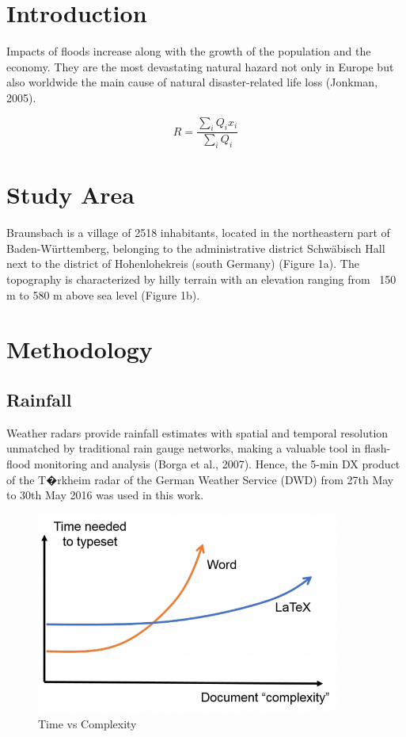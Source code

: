 \documentclass[preprint,12pt]{elsarticle}
\begin{document}

\section{Introduction}

Impacts of floods increase along with the growth of the population and the economy. They are the most devastating natural hazard not only in Europe but also worldwide the main cause of natural disaster-related life loss (Jonkman, 2005).

\begin{equation}
R=\frac{\sum_{i} Q_{i} x_i}{\sum_{i} Q_i}
\end{equation}

\section{Study Area}

Braunsbach is a village of 2518 inhabitants, located in the northeastern part of Baden-W{\"u}rttemberg, belonging to the administrative district Schw{\"a}bisch Hall next to the district of Hohenlohekreis (south Germany) (Figure 1a). The topography is characterized by hilly terrain with an elevation ranging from ~150 m to 580 m above sea level (Figure 1b).

\section{Methodology}

\subsection{Rainfall}

Weather radars provide rainfall estimates with spatial and temporal resolution unmatched by traditional rain gauge networks, making a valuable tool in flash-flood monitoring and analysis (Borga et al., 2007). Hence, the 5-min DX product of the T�rkheim radar of the German Weather Service (DWD) from 27th May to 30th May 2016 was used in this work. 

\begin{figure}
  \centering
    \includegraphics[width=10cm]{myplot1}
  \caption{Time vs Complexity}
\end{figure}
\end{document}
